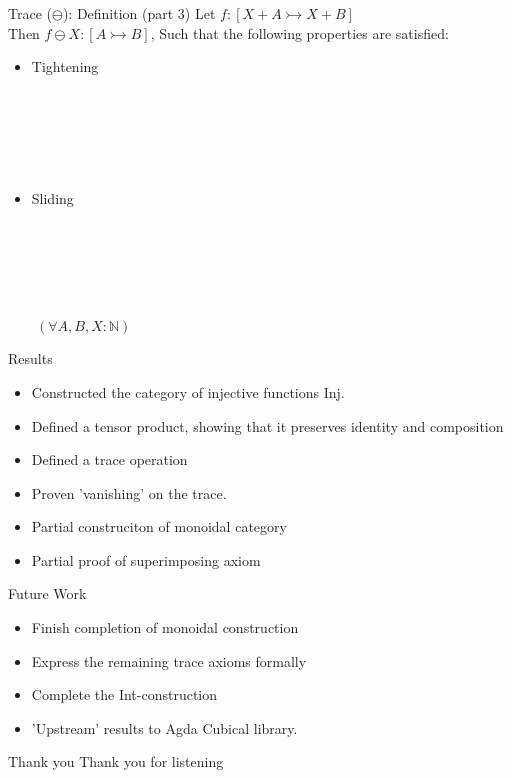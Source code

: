 \documentclass[aspectratio=169,16pt]{beamer}
\begin{document}
\begin{frame}{Trace ($\ominus$): Definition (part 3)}
  Let $f : [X + A \rightarrowtail X + B]$ \\
  Then $f \ominus X : [ A \rightarrowtail B ]$,
  Such that the following properties are satisfied:
  \begin{itemize}
  \item Tightening
  \\~\\~\\~\\~\\~\\
  \item Sliding
  \\~\\~\\~\\~\\~\\
  \end{itemize} $\qquad (\forall A,B,X : \mathbb{N})$
\end{frame}

\begin{frame}{Results}
  \large
  \begin{itemize}
  \item Constructed the category of injective functions \textrm{Inj}.
  \item Defined a tensor product, showing that it preserves identity
    and composition
  \item Defined a trace operation
  \item Proven 'vanishing' on the trace.
  \item Partial construciton of monoidal category
  \item Partial proof of superimposing axiom
  \end{itemize}
\end{frame}

\begin{frame}{Future Work}
  \Large
  \begin{itemize}
    \item Finish completion of monoidal construction
    \item Express the remaining trace axioms formally
    \item Complete the \textrm{Int}-construction
    \item 'Upstream' results to Agda Cubical library.
  \end{itemize}
\end{frame}

\begin{frame}{Thank you}
  \Huge
  Thank you for listening
\end{frame}
\end{document}
